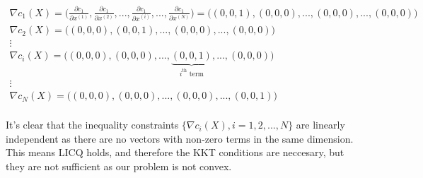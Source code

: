 \begin{align*}
    \nabla c_1(X) = \bigg( \frac{\partial c_1}{\partial x^{(1)}},\frac{\partial c_1}{\partial x^{(2)}},...,\frac{\partial c_1}{\partial x^{(i)}},...,\frac{\partial c_1}{\partial x^{(N)}} \bigg) =\bigg( (0,0,1),(0,0,0),...,(0,0,0),...,(0,0,0) \bigg) \\
    \nabla c_2(X) = \bigg( (0,0,0),(0,0,1),...,(0,0,0),...,(0,0,0) \bigg) \\
    \vdots 
    \hspace{200pt}\\
    \nabla c_i(X) = \bigg( (0,0,0),(0,0,0),...,\underbrace{(0,0,1)}_{i^{\text{th}}\text{ term}},...,(0,0,0) \bigg)\\
    \vdots
    \hspace{200pt}\\
    \nabla c_N(X) = \bigg( (0,0,0),(0,0,0),...,(0,0,0),...,(0,0,1) \bigg) \\
\end{align*}

It's clear that the inequality constraints $\{\nabla c_i(X),i=1,2,...,N\}$ are linearly independent as there are no vectors with non-zero terms in the same dimension. This means LICQ holds, and therefore the KKT conditions are neccesary, but they are not sufficient as our problem is not convex.